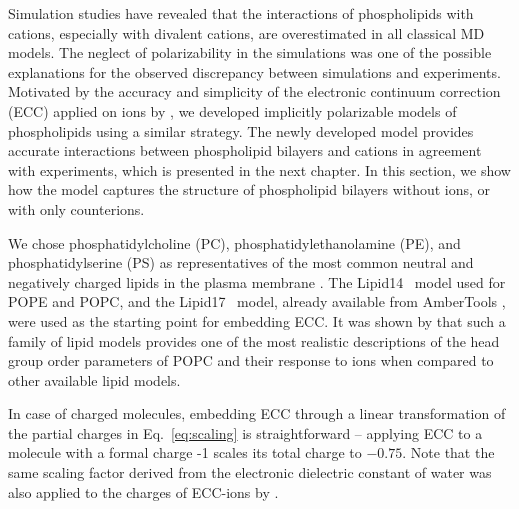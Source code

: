 Simulation studies have revealed that the interactions of phospholipids with cations, especially with divalent cations, 
are overestimated in all classical MD models. \citep{catte16,nmrlipids_proj4}
The neglect of polarizability in the simulations was one of the possible explanations for the observed discrepancy between simulations and experiments. 
Motivated by the accuracy and simplicity of the electronic continuum correction (ECC) applied on ions by \citep{martinek17},
we developed implicitly polarizable models of phospholipids using a similar strategy. 
The newly developed model provides accurate interactions between phospholipid bilayers and cations in agreement with experiments, 
which is presented in the next chapter.  
In this section, we show how the model captures the structure of phospholipid bilayers without ions, or with only counterions. 

We chose phosphatidylcholine (PC), phosphatidylethanolamine (PE), and phosphatidylserine (PS)
as representatives of the most common neutral and negatively charged lipids in the plasma membrane \citep{kroon2011_lipid_map, marsh13}. 
The Lipid14~\citep{dickson14} model used for POPE and POPC,
and the Lipid17~\citep{lipid17-future} model, already available from AmberTools \citep{ferrer13},
were used as the starting point for embedding ECC.
It was shown by \citet{botan15, catte16} that such a family of lipid models provides one of the most 
realistic descriptions of the head group order parameters of POPC and their response to ions 
when compared to other available lipid models. 

In case of charged molecules, 
embedding ECC through a linear transformation of the partial charges in Eq.~\ref{eq:scaling} is straightforward -- 
applying ECC to a molecule with a formal charge -1 scales its total charge to $-0.75$. 
Note that the same scaling factor derived from the electronic dielectric constant of water 
was also applied to the charges of ECC-ions by \citet{Pluharova2014, kohagen14, kohagen16, martinek17}.

